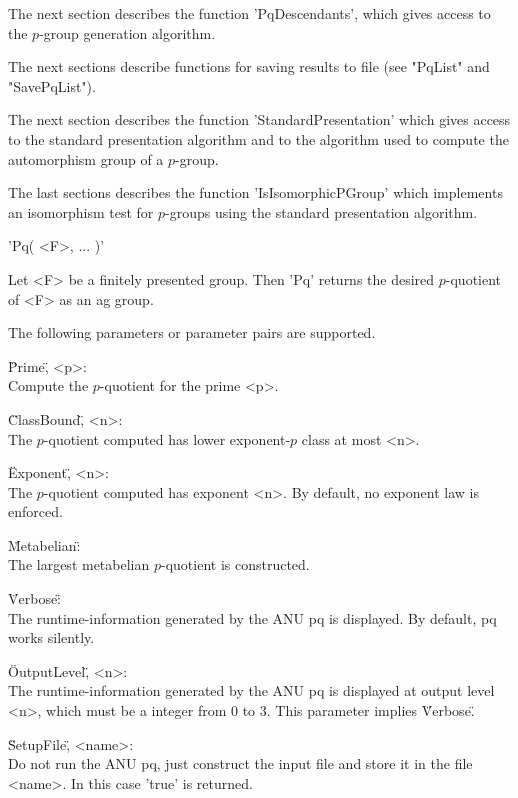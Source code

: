 The next section  describes  the  function 'PqDescendants',  which  gives
access to the $p$-group generation algorithm.

The next sections describe  functions for  saving  results  to  file (see
"PqList" and "SavePqList").

The  next  section describes  the  function 'StandardPresentation'  which
gives access to the standard presentation algorithm and to the  algorithm
used to compute the automorphism group of a $p$-group.

The  last sections  describes  the  function  'IsIsomorphicPGroup'  which
implements  an  isomorphism  test  for  $p$-groups  using  the   standard
presentation algorithm.


'Pq( <F>, ... )'

Let <F> be a  finitely presented  group.  Then  'Pq' returns  the desired
$p$-quotient of <F> as an ag group.

The following parameters or parameter pairs are supported.

\"Prime\", <p>: \\
    Compute the $p$-quotient for the prime <p>.

\"ClassBound\", <n>: \\
    The $p$-quotient computed has lower exponent-$p$ class at most <n>.

\"Exponent\", <n>: \\
    The $p$-quotient computed has exponent <n>.
    By default, no exponent law is enforced.

\"Metabelian\": \\
    The largest metabelian $p$-quotient is constructed.

\"Verbose\": \\
    The runtime-information generated  by  the ANU  pq is  displayed.  By
    default, pq works silently.

\"OutputLevel\", <n>: \\
    The runtime-information  generated by the  ANU  pq  is  displayed  at
    output  level  <n>,  which  must  be a  integer from  0 to  3.   This
    parameter implies \"Verbose\".

\"SetupFile\", <name>: \\
    Do not run the ANU pq, just  construct the input file and store it in
    the file <name>. In this case 'true' is returned.

